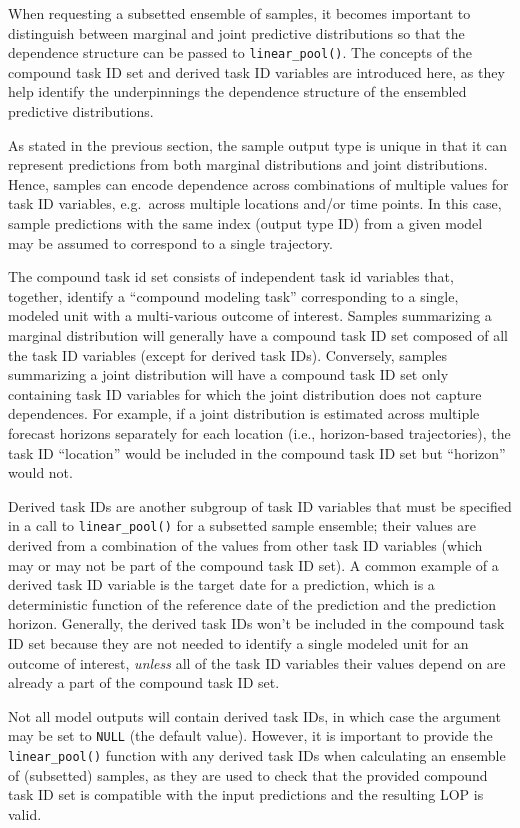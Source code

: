 \documentclass[
]{article}
\begin{document}
When requesting a subsetted ensemble of samples, it becomes important to
distinguish between marginal and joint predictive distributions so that
the dependence structure can be passed to \texttt{linear\_pool()}. The
concepts of the compound task ID set and derived task ID variables are
introduced here, as they help identify the underpinnings the dependence
structure of the ensembled predictive distributions.

As stated in the previous section, the sample output type is unique in
that it can represent predictions from both marginal distributions and
joint distributions. Hence, samples can encode dependence across
combinations of multiple values for task ID variables, e.g.~across
multiple locations and/or time points. In this case, sample predictions
with the same index (output type ID) from a given model may be assumed
to correspond to a single trajectory.

The compound task id set consists of independent task id variables that,
together, identify a ``compound modeling task'' corresponding to a
single, modeled unit with a multi-various outcome of interest. Samples
summarizing a marginal distribution will generally have a compound task
ID set composed of all the task ID variables (except for derived task
IDs). Conversely, samples summarizing a joint distribution will have a
compound task ID set only containing task ID variables for which the
joint distribution does not capture dependences. For example, if a joint
distribution is estimated across multiple forecast horizons separately
for each location (i.e., horizon-based trajectories), the task ID
``location'' would be included in the compound task ID set but
``horizon'' would not.

Derived task IDs are another subgroup of task ID variables that must be
specified in a call to \texttt{linear\_pool()} for a subsetted sample
ensemble; their values are derived from a combination of the values from
other task ID variables (which may or may not be part of the compound
task ID set). A common example of a derived task ID variable is the
target date for a prediction, which is a deterministic function of the
reference date of the prediction and the prediction horizon. Generally,
the derived task IDs won't be included in the compound task ID set
because they are not needed to identify a single modeled unit for an
outcome of interest, \emph{unless} all of the task ID variables their
values depend on are already a part of the compound task ID set.

Not all model outputs will contain derived task IDs, in which case the
argument may be set to \texttt{NULL} (the default value). However, it is
important to provide the \texttt{linear\_pool()} function with any
derived task IDs when calculating an ensemble of (subsetted) samples, as
they are used to check that the provided compound task ID set is
compatible with the input predictions and the resulting LOP is valid.
\end{document}
